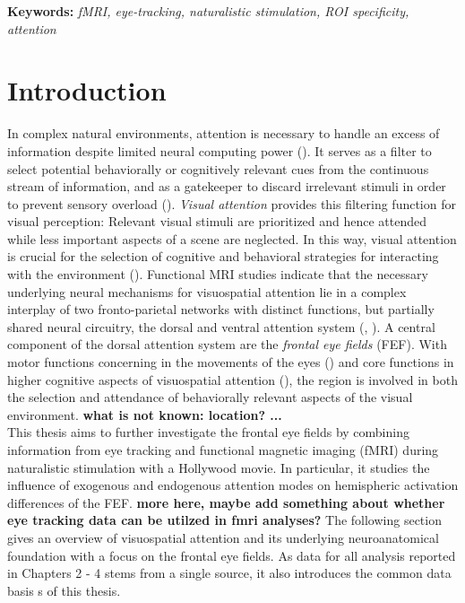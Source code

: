 \documentclass[a4paper, 12pt]{scrreprt}
\begin{document}
\bigskip

\textbf{Keywords:} \textit{fMRI, eye-tracking, naturalistic stimulation, ROI specificity, attention}



\chapter{Introduction}\label{section:intro}

In complex natural environments, attention is necessary to handle an excess of information despite limited neural computing power (\cite{carrasco2011visual}). It serves as a filter to select potential behaviorally or cognitively relevant cues from the continuous stream of information, and as a gatekeeper to discard irrelevant stimuli in order to prevent sensory overload (\cite{bellebaum2012neuropsych}). \textit{Visual attention} provides this filtering function for visual perception: Relevant visual stimuli are prioritized and hence attended while less important aspects of a scene are neglected. In this way, visual attention is crucial for the selection of cognitive and behavioral strategies for interacting with the environment (\cite{siegelbaum2000neuro}).\newline
Functional MRI studies indicate that the necessary underlying neural mechanisms for visuospatial attention lie in a complex interplay of two fronto-parietal networks with distinct functions, but partially shared neural circuitry, the dorsal and ventral attention system (\cite{corbetta2002control}, \cite{vossel2014dorsal}). 
A central component of the dorsal attention system are the \textit{frontal eye fields} (FEF). With motor functions concerning in the movements of the eyes (\cite{krauzlis2014eye}) and core functions in higher cognitive aspects of visuospatial attention (\cite{vernet2014corrigendum}), the region is involved in both the selection and attendance of behaviorally relevant aspects of the visual environment. \textbf{what is not known: location? ...}\\ 
This thesis aims to further investigate the frontal eye fields by combining information from eye tracking and functional magnetic imaging (fMRI) during naturalistic stimulation with a Hollywood movie. In particular, it studies the influence of exogenous and endogenous attention modes on hemispheric activation differences of the FEF. \textbf{more here, maybe add something about whether eye tracking data can be utilzed in fmri analyses?}
The following section gives an overview of visuospatial attention and its underlying neuroanatomical foundation with a focus on the frontal eye fields. As data for all analysis reported in Chapters 2 - 4 stems from a single source, it also introduces the common data basis s of this thesis. \\
\end{document}
